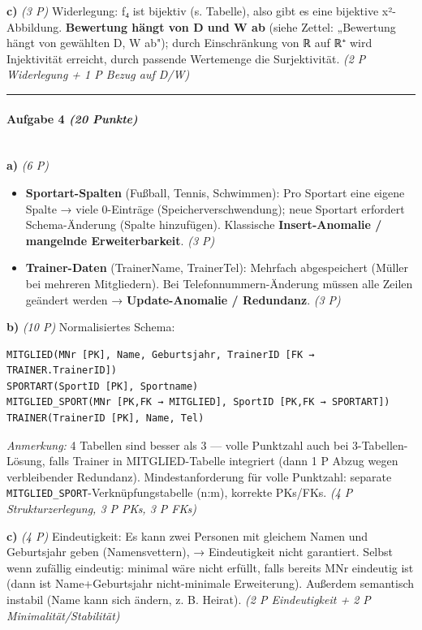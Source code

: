 \documentclass[11pt, a4paper]{article}
\begin{document}
\textbf{c)} \textit{(3 P)} Widerlegung: f₄ ist bijektiv (s. Tabelle), also gibt es eine bijektive x²-Abbildung. \textbf{Bewertung hängt von D und W ab} (siehe Zettel: „Bewertung hängt von gewählten D, W ab"); durch Einschränkung von ℝ auf ℝ⁺ wird Injektivität erreicht, durch passende Wertemenge die Surjektivität. \textit{(2 P Widerlegung + 1 P Bezug auf D/W)}



\noindent\textcolor{rulegray}{\rule{\linewidth}{0.4pt}}


\paragraph{Aufgabe 4 \textit{(20 Punkte)}}\mbox{}\\[2pt]

\textbf{a)} \textit{(6 P)}

\begin{itemize}
  \item \textbf{Sportart-Spalten} (Fußball, Tennis, Schwimmen): Pro Sportart eine eigene Spalte → viele 0-Einträge (Speicherverschwendung); neue Sportart erfordert Schema-Änderung (Spalte hinzufügen). Klassische \textbf{Insert-Anomalie / mangelnde Erweiterbarkeit}. \textit{(3 P)}
  \item \textbf{Trainer-Daten} (TrainerName, TrainerTel): Mehrfach abgespeichert (Müller bei mehreren Mitgliedern). Bei Telefonnummern-Änderung müssen alle Zeilen geändert werden → \textbf{Update-Anomalie / Redundanz}. \textit{(3 P)}
\end{itemize}

\textbf{b)} \textit{(10 P)} Normalisiertes Schema:


\begin{lstlisting}
MITGLIED(MNr [PK], Name, Geburtsjahr, TrainerID [FK → TRAINER.TrainerID])
SPORTART(SportID [PK], Sportname)
MITGLIED_SPORT(MNr [PK,FK → MITGLIED], SportID [PK,FK → SPORTART])
TRAINER(TrainerID [PK], Name, Tel)
\end{lstlisting}


\textit{Anmerkung:} 4 Tabellen sind besser als 3 — volle Punktzahl auch bei 3-Tabellen-Lösung, falls Trainer in MITGLIED-Tabelle integriert (dann 1 P Abzug wegen verbleibender Redundanz). Mindestanforderung für volle Punktzahl: separate \texttt{MITGLIED\_SPORT}-Verknüpfungstabelle (n:m), korrekte PKs/FKs. \textit{(4 P Strukturzerlegung, 3 P PKs, 3 P FKs)}


\textbf{c)} \textit{(4 P)} Eindeutigkeit: Es kann zwei Personen mit gleichem Namen und Geburtsjahr geben (Namensvettern), → Eindeutigkeit nicht garantiert. Selbst wenn zufällig eindeutig: minimal wäre nicht erfüllt, falls bereits MNr eindeutig ist (dann ist Name+Geburtsjahr nicht-minimale Erweiterung). Außerdem semantisch instabil (Name kann sich ändern, z. B. Heirat). \textit{(2 P Eindeutigkeit + 2 P Minimalität/Stabilität)}
\end{document}
